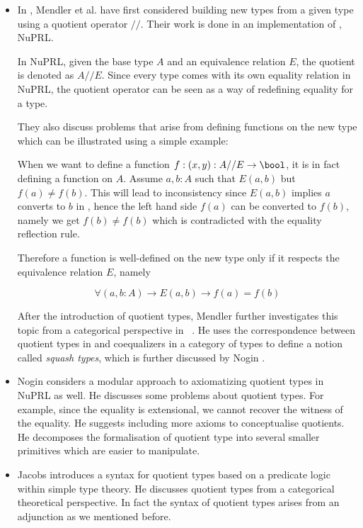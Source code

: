 \begin{itemize}

\item In \cite{cab}, Mendler et al. have first considered building new types from a
given type using a quotient operator $//$. Their work is done in an
implementation of \ett, NuPRL. 

In NuPRL, given the base type $A$ and an equivalence relation $E$, the quotient is denoted as $A//E$. Since every type comes with its own equality relation in NuPRL, the quotient operator can be
seen as a way of redefining equality for a type.

They also discuss problems that arise from defining functions on the new type which can be illustrated using a simple example:

When we want to define a function $f : (x,y) : A//E \to \bool$, it is in fact defining a function on $A$. Assume $a, b : A$ such that $E(a,b)$ but $f(a) \not= f(b)$. This will lead to
inconsistency since $E(a,b)$ implies $a$ converts to $b$ in \ett, hence
the left hand side $f(a)$ can be converted to $f(b)$, namely we get $f(b) \not= f(b)$
which is contradicted with the equality reflection rule. 

Therefore a function is well-defined \cite{cab} on the new type only
if it respects the equivalence relation $E$, namely

$$\forall (a,b : A) \to E(a,b) \to f(a) = f(b)$$


 After the introduction of quotient types, Mendler further investigates
 this topic from a categorical perspective in ~\cite{men:90}. He uses
 the correspondence between quotient types in \mltt{} and coequalizers
 in a category of types to define a notion called \emph{squash types},
 which is further discussed by Nogin \cite{nog:02}.

\item Nogin \cite{nog:02} considers a modular approach to axiomatizing quotient types in NuPRL as well. He discusses some problems about quotient types. For example, since the equality is
extensional, we cannot recover the
witness of the equality.  He suggests including more axioms to
conceptualise quotients. He decomposes the formalisation of quotient type
into several smaller primitives which are easier to manipulate.


\item Jacobs \cite{Jacobs94quotientsin} introduces a syntax for quotient types based on a predicate logic
within simple type theory. He discusses quotient types from a categorical theoretical perspective. In fact the syntax of quotient types arises from an adjunction as we mentioned before.


\end{itemize}
